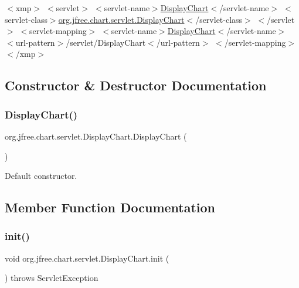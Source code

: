 $<$xmp$>$ $<$servlet$>$ $<$servlet-\/name$>$\mbox{\hyperlink{classorg_1_1jfree_1_1chart_1_1servlet_1_1_display_chart}{Display\+Chart}}$<$/servlet-\/name$>$ $<$servlet-\/class$>$\mbox{\hyperlink{classorg_1_1jfree_1_1chart_1_1servlet_1_1_display_chart}{org.\+jfree.\+chart.\+servlet.\+Display\+Chart}}$<$/servlet-\/class$>$ $<$/servlet$>$ $<$servlet-\/mapping$>$ $<$servlet-\/name$>$\mbox{\hyperlink{classorg_1_1jfree_1_1chart_1_1servlet_1_1_display_chart}{Display\+Chart}}$<$/servlet-\/name$>$ $<$url-\/pattern$>$/servlet/\+Display\+Chart$<$/url-\/pattern$>$ $<$/servlet-\/mapping$>$ $<$/xmp$>$ 

\subsection{Constructor \& Destructor Documentation}
\mbox{\label{classorg_1_1jfree_1_1chart_1_1servlet_1_1_display_chart_aaf3c909080ec6f755edac69a9b20f157}} 
\subsubsection{\texorpdfstring{Display\+Chart()}{DisplayChart()}}
{\footnotesize\ttfamily org.\+jfree.\+chart.\+servlet.\+Display\+Chart.\+Display\+Chart (\begin{DoxyParamCaption}{ }\end{DoxyParamCaption})}

Default constructor. 

\subsection{Member Function Documentation}
\mbox{\label{classorg_1_1jfree_1_1chart_1_1servlet_1_1_display_chart_ab825c900255fc58e4d1912118a27a131}} 
\subsubsection{\texorpdfstring{init()}{init()}}
{\footnotesize\ttfamily void org.\+jfree.\+chart.\+servlet.\+Display\+Chart.\+init (\begin{DoxyParamCaption}{ }\end{DoxyParamCaption}) throws Servlet\+Exception}

